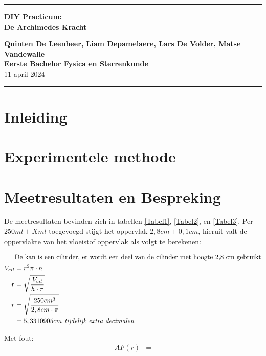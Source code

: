 \documentclass[10pt,a4paper,twoside]{article}
\begin{document}
\begin{center}
\hrule

\vspace{.4cm}
{\bf {\Huge DIY Practicum:\\ De Archimedes Kracht}}
\vspace{.2cm}
\end{center}
{\bf Quinten De Leenheer, Liam Depamelaere, Lars De Volder, Matse Vandewalle}  \\
{\bf Eerste Bachelor Fysica en Sterrenkunde} \hspace{\fill} \\
11 april 2024 \\
\hrule

\section{Inleiding}

\section{Experimentele methode}

\section{Meetresultaten en Bespreking}

De meetresultaten bevinden zich in tabellen \ref{Tabel1}, \ref{Tabel2}, en \ref{Tabel3}.
Per $250ml \pm Xml$ toegevoegd stijgt het oppervlak $2,8cm \pm 0,1cm$,
hieruit valt de oppervlakte van het vloeistof oppervlak als volgt te berekenen:

\begin{align}
	&\text{De kan is een cilinder,
		  er wordt een deel van de cilinder met hoogte 2,8 cm gebruikt}\\
	V_{cil} &= r^2 \pi \cdot h\\
	r &= \sqrt{\frac{V_{cil}}{h \cdot \pi}}\\
	r &= \sqrt{\frac{250cm^3}{2,8cm \cdot \pi}}\\
	  &= 5,3310905cm \emph{   tijdelijk extra decimalen}
\end{align}

Met fout:
\begin{align}
	AF(r) &= 
\end{align}
\end{document}
